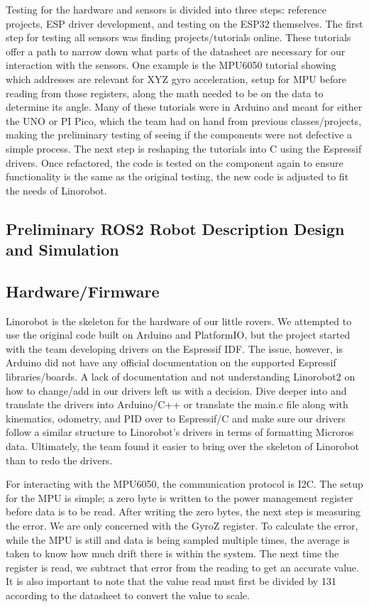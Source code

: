 \documentclass[conference]{IEEEtran}
\begin{document}
Testing for the hardware and sensors is divided into three steps: reference projects, ESP driver development, and testing on the ESP32 themselves. The first step for testing all sensors was finding projects/tutorials online. These tutorials offer a path to narrow down what parts of the datasheet are necessary for our interaction with the sensors. One example is the MPU6050 tutorial showing which addresses are relevant for XYZ gyro acceleration, setup for MPU before reading from those registers, along the math needed to be on the data to determine its angle. Many of these tutorials were in Arduino and meant for either the UNO or PI Pico, which the team had on hand from previous classes/projects, making the preliminary testing of seeing if the components were not defective a simple process. The next step is reshaping the tutorials into C using the Espressif drivers. Once refactored, the code is tested on the component again to ensure functionality is the same as the original testing, the new code is adjusted to fit the needs of Linorobot.



\subsection{Preliminary ROS2 Robot Description Design and Simulation}

\subsection{Hardware/Firmware}
Linorobot is the skeleton for the hardware of our little rovers. We attempted to use the original code built on Arduino and PlatformIO, but the project started with the team developing drivers on the Espressif IDF. The issue, however, is Arduino did not have any official documentation on the supported Espressif libraries/boards. A lack of documentation and not understanding Linorobot2 on how to change/add in our drivers left us with a decision. Dive deeper into and translate the drivers into Arduino/C++ or translate the main.c file along with kinematics, odometry, and PID over to Espressif/C and make sure our drivers follow a similar structure to Linorobot’s drivers in terms of formatting Microros data. Ultimately, the team found it easier to bring over the skeleton of Linorobot than to redo the drivers.

 For interacting with the MPU6050, the communication protocol is I2C. The setup for the MPU is simple; a zero byte is written to the power management register before data is to be read. After writing the zero bytes, the next step is measuring the error. We are only concerned with the GyroZ register. To calculate the error, while the MPU is still and data is being sampled multiple times, the average is taken to know how much drift there is within the system. The next time the register is read, we subtract that error from the reading to get an accurate value. It is also important to note that the value read must first be divided by 131 according to the datasheet to convert the value to scale.
 
\end{document}
